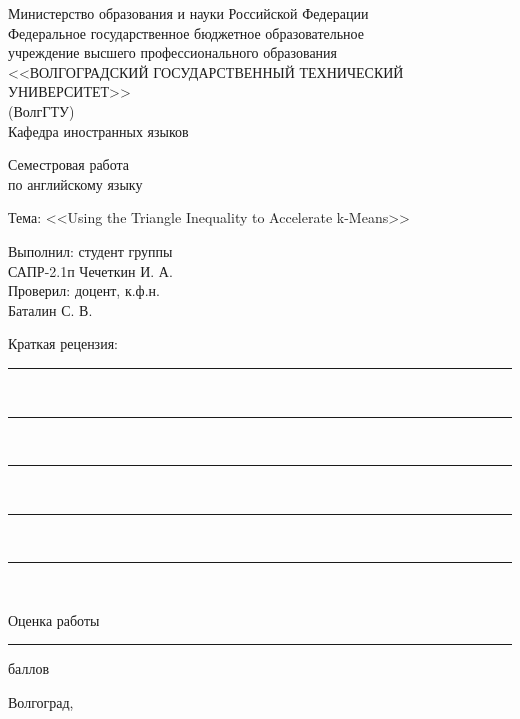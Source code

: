 \begin{titlepage}
  \begin{center}
    Министерство образования и науки Российской Федерации \\
    Федеральное государственное бюджетное образовательное \\
    учреждение высшего профессионального образования \\
    <<ВОЛГОГРАДСКИЙ ГОСУДАРСТВЕННЫЙ ТЕХНИЧЕСКИЙ УНИВЕРСИТЕТ>> \\
    (ВолгГТУ) \\
    Кафедра иностранных языков
  \end{center}
  \vspace{7em}
  \begin{center}
    {\large Семестровая работа}\\
    по английскому языку
  \end{center}
  \begin{center}
    Тема: <<Using the Triangle Inequality to Accelerate k-Means>>
  \end{center}
  \vspace{2em}

  \begin{flushright}
    \begin{minipage}{.40\textwidth}
      Выполнил: студент группы \\
      САПР-2.1п Чечеткин И. А. \\[.25em]

      Проверил: доцент, к.ф.н.\\
      Баталин С. В.
    \end{minipage}
  \end{flushright}
  \vspace{1em}
  Краткая рецензия:\hspace{1ex}\rule{25.4em}{.25pt}\\
  \hrule~\\\hrule~\\\hrule~\\\hrule~\\
  \begin{center}
    Оценка работы \rule{7.5em}{.5pt} баллов
  \end{center}

  \vfill
  \begin{center}
    Волгоград, \the\year
  \end{center}
\end{titlepage}
